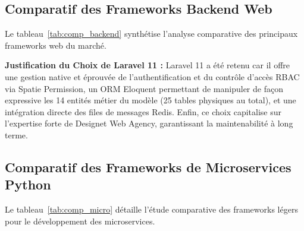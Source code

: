 \subsection{Comparatif des Frameworks Backend Web}
\par Le tableau~\ref{tab:comp_backend} synth\'etise l'analyse comparative des principaux frameworks web du march\'e.

\begin{table}[H]
\centering
\caption{Analyse Comparative des Frameworks Web Backend}
\label{tab:comp_backend}
%
\end{table}
\par \textbf{Justification du Choix de Laravel 11 :} Laravel 11 a \'et\'e retenu car il offre une gestion native et \'eprouv\'ee de l'authentification et du contr\^ole d'acc\`es RBAC via Spatie Permission, un ORM Eloquent permettant de manipuler de fa\c{c}on expressive les 14 entit\'es m\'etier du mod\`ele (25 tables physiques au total), et une int\'egration directe des files de messages Redis. Enfin, ce choix capitalise sur l'expertise forte de Designet Web Agency, garantissant la maintenabilit\'e \`a long terme.

\subsection{Comparatif des Frameworks de Microservices Python}
\par Le tableau~\ref{tab:comp_micro} d\'etaille l'\'etude comparative des frameworks l\'egers pour le d\'eveloppement des microservices.

